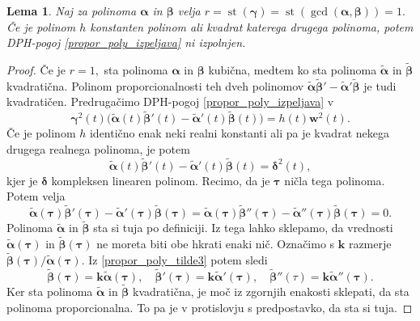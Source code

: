 \documentclass[12pt,a4paper,twoside]{article}
\theoremstyle{definition} %
\theoremstyle{plain} %
\newtheorem{lema}[definicija]{Lema}
\theoremstyle{primerstyle}
\numberwithin{equation}{section}  %
\newcommand{\kV}{\mathbf{k}}
\newcommand{\wV}{\mathbf{w}}
\newcommand{\balpha}{\boldsymbol \alpha}
\newcommand{\bbeta}{\boldsymbol \beta}
\newcommand{\bgamma}{\boldsymbol \gamma}
\newcommand{\bdelta}{\boldsymbol \delta}
\newcommand{\btau}{\boldsymbol \tau}
\newcommand{\btalpha}{\tilde{\boldsymbol \alpha}}
\newcommand{\btbeta}{\tilde{\boldsymbol \beta}}
\DeclareMathOperator{\st}{st}
\begin{document}
\begin{lema}
	\label{lema_2}
	Naj za polinoma $\balpha$ in $\bbeta$ velja $r=\st(\bgamma)=\st(\gcd(\balpha,\bbeta))=1.$ Če je polinom $h$ konstanten polinom ali kvadrat katerega drugega polinoma, potem DPH-pogoj \eqref{propor_poly_izpeljava} ni izpolnjen.
\end{lema}
\begin{proof}
	Če je $r=1,$ sta polinoma $\balpha$ in $\bbeta$ kubična, medtem ko sta polinoma $\btalpha$ in $\btbeta$ kvadratična. Polinom proporcionalnosti teh dveh polinomov $\btalpha\btbeta'-\btalpha'\btbeta$ je tudi kvadratičen. Predrugačimo DPH-pogoj \eqref{propor_poly_izpeljava} v
	\begin{equation}
		\label{propor_poly_tilde}
		\bgamma^2(t)\big(\btalpha(t)\btbeta'(t)-\btalpha'(t)\btbeta(t)\big)=h(t)\wV^2(t).
	\end{equation}
	Če je polinom $h$ identično enak neki realni konstanti ali pa je kvadrat nekega drugega realnega polinoma, je potem
	\begin{equation}
		\label{propor_poly_tilde2}
		\btalpha(t)\btbeta'(t)-\btalpha'(t)\btbeta(t)=\bdelta^2(t),
	\end{equation}
	kjer je $\bdelta$ kompleksen linearen polinom. Recimo, da je $\btau$ ničla tega polinoma. Potem velja
	\begin{equation}
		\label{propor_poly_tilde3}
		\btalpha(\btau)\btbeta'(\btau)-\btalpha'(\btau)\btbeta(\btau)=\btalpha(\btau)\btbeta''(\btau)-\btalpha''(\btau)\btbeta(\btau)=0.
	\end{equation}
	Polinoma $\btalpha$ in $\btbeta$ sta si tuja po definiciji. Iz tega lahko sklepamo, da vrednosti $\btalpha(\btau)$ in $\btbeta(\btau)$ ne moreta biti obe hkrati enaki nič. Označimo s $\kV$ razmerje $\btbeta(\btau)/\btalpha(\btau).$ Iz \eqref{propor_poly_tilde3} potem sledi
	\begin{equation}
		\btbeta(\btau)=\kV\btalpha(\btau),\quad\btbeta'(\btau)=\kV\btalpha'(\btau),\quad\btbeta''(\tau)=\kV\btalpha''(\btau).
	\end{equation}
	Ker sta polinoma $\btalpha$ in $\btbeta$ kvadratična, je moč iz zgornjih enakosti sklepati, da sta polinoma proporcionalna. To pa je v protislovju s predpostavko, da sta si tuja.
	

\end{proof}
\end{document}

